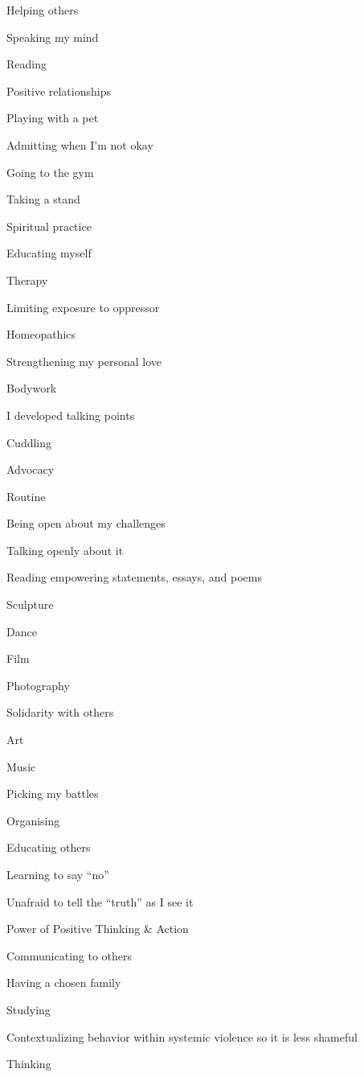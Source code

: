 \begin{multicols}{2}
\begin{checkboxlist}
\item Helping others
\item Speaking my mind
\item Reading
\item Positive relationships
\item Playing with a pet
\item Admitting when I’m not okay
\item Going to the gym
\item Taking a stand
\item Spiritual practice
\item Educating myself
\item Therapy
\item Limiting exposure to oppressor
\item Homeopathics
\item Strengthening my personal love
\item Bodywork
\item I developed talking points
\item Cuddling
\item Advocacy
\item Routine
\item Being open about my challenges
\item Talking openly about it
\item Reading empowering statements, essays, and poems
\item Sculpture
\item Dance
\item Film
\item Photography
\item Solidarity with others
\item Art
\item Music
\item Picking my battles
\item Organising
\item Educating others
\item Learning to say “no”
\item Unafraid to tell the “truth” as I see it
\item Power of Positive Thinking & Action
\item Communicating to others
\item Having a chosen family
\item Studying
\item Contextualizing behavior within systemic violence so it is less shameful
\item Thinking

\end{checkboxlist}
\end{multicols}
